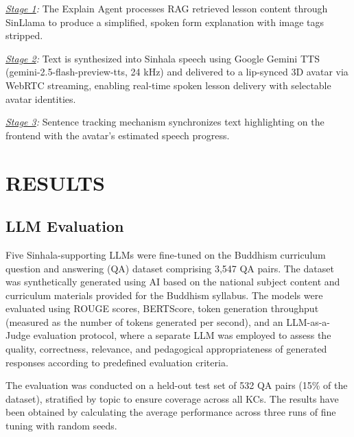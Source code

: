 \documentclass[conference]{IEEEtran}
\begin{document}
\textit{\underline{Stage 1}:} The Explain Agent processes RAG retrieved lesson content through SinLlama to produce a simplified, spoken form explanation with image tags stripped.

\textit{\underline{Stage 2}:} Text is synthesized into Sinhala speech using Google Gemini TTS (gemini-2.5-flash-preview-tts, 24 kHz) and delivered to a lip-synced 3D avatar via WebRTC streaming, enabling real-time spoken lesson delivery with selectable avatar identities.

\textit{\underline{Stage 3}:} Sentence tracking mechanism synchronizes text highlighting on the frontend with the avatar's estimated speech progress.

\section{RESULTS}
\subsection{LLM Evaluation}
Five Sinhala-supporting LLMs were fine-tuned on the Buddhism curriculum question and answering (QA) dataset comprising 3,547 QA pairs. The dataset was synthetically generated using AI based on the national subject content and curriculum materials provided for the Buddhism syllabus. The models were evaluated using ROUGE scores, BERTScore, token generation throughput (measured as the number of tokens generated per second), and an LLM-as-a-Judge evaluation protocol, where a separate LLM was employed to assess the quality, correctness, relevance, and pedagogical appropriateness of generated responses according to predefined evaluation criteria.

The evaluation was conducted on a held-out test set of 532 QA pairs (15\% of the dataset), stratified by topic to ensure coverage across all KCs. The results have been obtained by calculating the average performance across three runs of fine tuning with random seeds.
\end{document}
